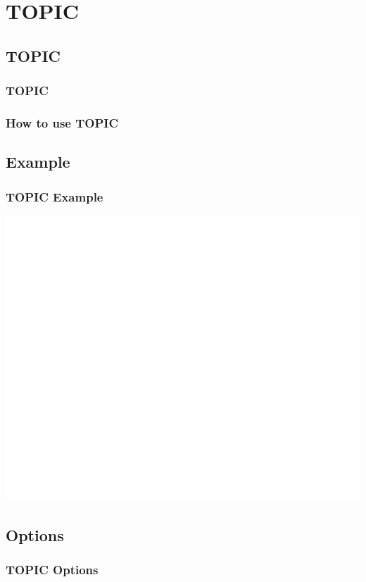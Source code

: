 \documentclass{beamer}
\begin{document}
		
\section{TOPIC}

\subsection{TOPIC}		

\begin{frame}
	\frametitle{TOPIC}
	\begin{outline}
		\1 
	\end{outline}
\end{frame}

\begin{frame}
	\frametitle{How to use TOPIC}
	\begin{outline}
		\1 
	\end{outline}
\end{frame}

\subsection{Example}		
\begin{frame}
	\frametitle{TOPIC Example}
	\begin{center}
		\includegraphics[width=1.0\textwidth]{images/TOPIC example.png}
	\end{center}
\end{frame}

\subsection{Options}		
\begin{frame}
	\frametitle{TOPIC Options}
	\begin{outline}
		\1 
	\end{outline}
\end{frame}
\end{document}
